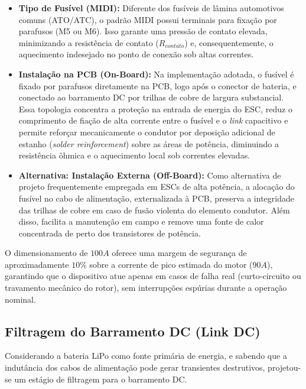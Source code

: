 \begin{itemize}
    \item \textbf{Tipo de Fusível (MIDI):} Diferente dos fusíveis de lâmina automotivos comuns (ATO/ATC), o padrão MIDI possui terminais para fixação por parafusos (M5 ou M6). Isso garante uma pressão de contato elevada, minimizando a resistência de contato ($R_{contato}$) e, consequentemente, o aquecimento indesejado no ponto de conexão sob altas correntes.
    
    \item \textbf{Instalação na PCB (On-Board):} Na implementação adotada, o fusível é fixado por parafusos diretamente na PCB, logo após o conector de bateria, e conectado ao barramento DC por trilhas de cobre de largura substancial. Essa topologia concentra a proteção na entrada de energia do ESC, reduz o comprimento de fiação de alta corrente entre o fusível e o \textit{link} capacitivo e permite reforçar mecanicamente o condutor por deposição adicional de estanho (\textit{solder reinforcement}) sobre as áreas de potência, diminuindo a resistência ôhmica e o aquecimento local sob correntes elevadas.
    
    \item \textbf{Alternativa: Instalação Externa (Off-Board):} Como alternativa de projeto frequentemente empregada em ESCs de alta potência, a alocação do fusível no cabo de alimentação, externalizada à PCB, preserva a integridade das trilhas de cobre em caso de fusão violenta do elemento condutor. Além disso, facilita a manutenção em campo e remove uma fonte de calor concentrada de perto dos transistores de potência.
\end{itemize}

O dimensionamento de $100 A$ oferece uma margem de segurança de aproximadamente $10\%$ sobre a corrente de pico estimada do motor ($90 A$), garantindo que o dispositivo atue apenas em casos de falha real (curto-circuito ou travamento mecânico do rotor), sem interrupções espúrias durante a operação nominal.

\subsection{Filtragem do Barramento DC (Link DC)}

Considerando a bateria LiPo como fonte primária de energia, e sabendo que a indutância dos cabos de alimentação pode gerar transientes destrutivos, projetou-se um estágio de filtragem para o barramento DC.

